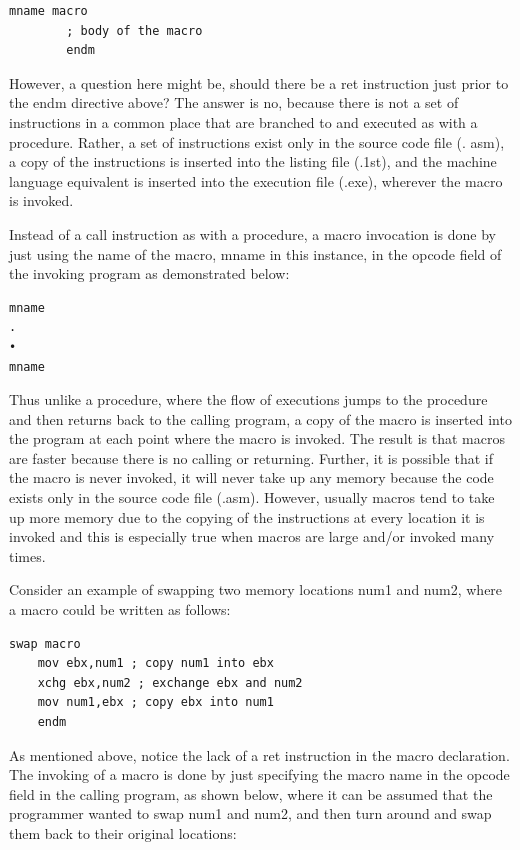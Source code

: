 \documentclass[10pt]{book}
\begin{document}
\begin{center}
\begin{center}
\begin{verbatim}
mname macro
        ; body of the macro
        endm
\end{verbatim}

However, a question here might be, should there be a ret instruction just prior to the endm directive above? The answer is no, because there is not a set of instructions in a common place that are branched to and executed as with a procedure. Rather, a set of instructions exist only in the source code file (. asm), a copy of the instructions is inserted into the listing file (.1st), and the machine language equivalent is inserted into the execution file (.exe), wherever the macro is invoked.

Instead of a call instruction as with a procedure, a macro invocation is done by just using the name of the macro, mname in this instance, in the opcode field of the invoking program as demonstrated below:


\begin{verbatim}
mname
.
•
mname
\end{verbatim}

Thus unlike a procedure, where the flow of executions jumps to the procedure and then returns back to the calling program, a copy of the macro is inserted into the program at each point where the macro is invoked. The result is that macros are faster because there is no calling or returning. Further, it is possible that if the macro is never invoked, it will never take up any memory because the code exists only in the source code file (.asm). However, usually macros tend to take up more memory due to the copying of the instructions at every location it is invoked and this is especially true when macros are large and/or invoked many times.

Consider an example of swapping two memory locations num1 and num2, where a macro could be written as follows:

\begin{verbatim}
swap macro
    mov ebx,num1 ; copy num1 into ebx
    xchg ebx,num2 ; exchange ebx and num2
    mov num1,ebx ; copy ebx into num1
    endm
\end{verbatim}

As mentioned above, notice the lack of a ret instruction in the macro declaration. The invoking of a macro is done by just specifying the macro name in the opcode field in the calling program, as shown below, where it can be assumed that the programmer wanted to swap num1 and num2, and then turn around and swap them back to their original locations:


\end{center}
\end{center}
\end{document}
